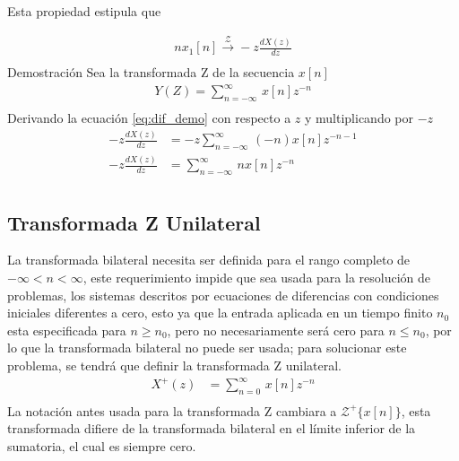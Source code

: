 \documentclass[12pt]{article}
\begin{document}
Esta propiedad estipula que\par
\begin{equation}
    \begin{split}
        nx_{1}[n]\xrightarrow{\mathscr{Z}}-z\frac{dX(z)}{dz}\\
    \end{split}
    \label{eq:dif}
\end{equation}
Demostración
Sea la transformada Z de la secuencia $x[n]$ 
\begin{equation}
    \begin{split}
        Y(Z)=\displaystyle\sum_{n=-\infty}^{\infty}\,x[n]z^{-n}\\
    \end{split}
    \label{eq:dif_demo}
\end{equation}
Derivando la ecuación \ref{eq:dif_demo} con respecto a $z$ y multiplicando por $-z$
\begin{equation}
    \begin{split}
        -z\frac{dX(z)}{dz}&=-z\displaystyle\sum_{n=-\infty}^{\infty}\,(-n)x[n]z^{-n-1}\\
        -z\frac{dX(z)}{dz}&=\displaystyle\sum_{n=-\infty}^{\infty}\,nx[n]z^{-n}\\
    \end{split}
    \label{eq:dif_demo1}
\end{equation}
\subsection{Transformada Z Unilateral}
La transformada bilateral necesita ser definida para el rango completo de $-\infty<n<\infty$, este requerimiento impide que sea usada para la resolución de problemas, los sistemas descritos por ecuaciones de diferencias con condiciones iniciales diferentes a cero, esto ya que la entrada aplicada en un tiempo finito $n_{0}$ esta especificada para $n\ge n_{0}$, pero no necesariamente será cero para $n\le n_{0}$, por lo que la transformada bilateral no puede ser usada; para solucionar este problema, se tendrá que definir la transformada Z unilateral. \cite{proakis1996digital}
\begin{equation}
    \begin{split}
        X^+(z)&=\displaystyle\sum_{n=0}^{\infty}\,x[n]z^{-n}\\
    \end{split}
    \label{eq:zt_unilateral}
\end{equation}
La notación antes usada para la transformada Z cambiara a $\mathscr{Z}^+\{x[n]\}$, esta transformada difiere de la transformada bilateral en el límite inferior de la sumatoria, el cual es siempre cero.
\end{document}
